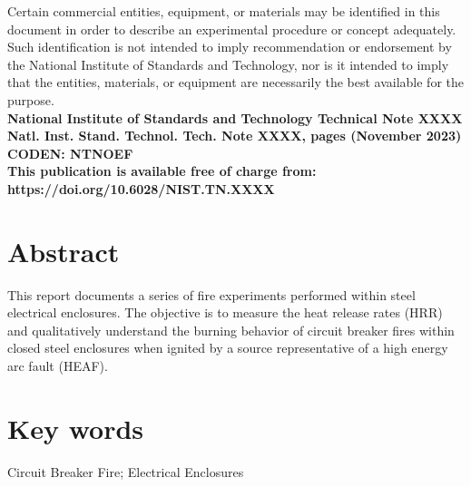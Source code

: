\documentclass[12pt]{article}
\newcommand{\pubnumber}{XXXX}
\newcommand{\DOI}{https://doi.org/10.6028/NIST.TN.XXXX}
\newcommand{\monthyear}{November 2023}
\begin{document}
\begin{titlepage}
\begin{flushright}
\footnotesize  Certain commercial entities, equipment, or materials may be identified in this document in order to describe an experimental procedure or concept adequately. Such identification is not intended to imply recommendation or endorsement by the National Institute of Standards and Technology, nor is it intended to imply that the entities, materials, or equipment are necessarily the best available for the purpose.\\
\vfill
\normalsize \textbf{National Institute of Standards and Technology Technical Note \pubnumber\\
Natl. Inst. Stand. Technol. Tech. Note \pubnumber, \pageref{LastPage} pages (\monthyear)} \\
\textbf{CODEN: NTNOEF}\\
\vspace{12pt}
\textbf{This publication is available free of charge from: \DOI}
\vfill
\end{flushright}
\end{titlepage}


\section*{Abstract}
\normalsize This report documents a series of fire experiments performed within steel electrical enclosures. The objective is to measure the heat release rates (HRR) and qualitatively understand the burning behavior of circuit breaker fires within closed steel enclosures when ignited by a source representative of a high energy arc fault (HEAF).  \\
\section*{Key words}
\normalsize Circuit Breaker Fire; Electrical Enclosures\\
\pagebreak
\begin{center}
	\tableofcontents
	\listoftables
	\listoffigures
\end{center}
\end{document}
